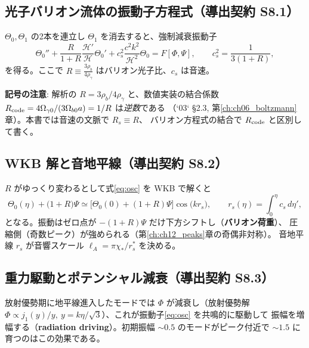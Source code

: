 \subsection{光子バリオン流体の振動子方程式（導出契約 S8.1）}
$\Theta_0,\Theta_1$ の2本を連立し $\Theta_1$ を消去すると、強制減衰振動子
\begin{equation}
  \Theta_0''+\frac{R}{1+R}\frac{\mathcal H'}{\mathcal H}\Theta_0'
  +c_s^2\frac{c^2k^2}{\mathcal H^2}\Theta_0=F[\Phi,\Psi],\qquad
  c_s^2=\frac{1}{3(1+R)},
  \label{eq:osc}
\end{equation}
を得る。ここで $R\equiv\frac{3\rho_b}{4\rho_\gamma}$ はバリオン光子比、$c_s$ は音速。

\begin{numreality}
\textbf{記号の注意}: 解析の $R=3\rho_b/4\rho_\gamma$ と、数値実装の結合係数
$R_{\rm code}=4\Omega_{\gamma0}/(3\Omega_{b0}a)=1/R$ は\emph{逆数}である
（`03` §2.3, 第\ref{ch:ch06_boltzmann}章）。本書では音速の文脈で $R_s\equiv R$、
バリオン方程式の結合で $R_{\rm code}$ と区別して書く。
\end{numreality}

\subsection{WKB 解と音地平線（導出契約 S8.2）}
$R$ がゆっくり変わるとして式\eqref{eq:osc} を WKB で解くと
\begin{equation}
  \Theta_0(\eta)+\big(1+R\big)\Psi\simeq\big[\Theta_0(0)+(1+R)\Psi\big]\cos\!\big(kr_s\big),
  \qquad r_s(\eta)=\int_0^\eta c_s\,d\eta',
\end{equation}
となる。振動はゼロ点が $-(1+R)\Psi$ だけ下方シフトし（\textbf{バリオン荷重}）、
圧縮側（奇数ピーク）が強められる（第\ref{ch:ch12_peaks}章の奇偶非対称）。
音地平線 $r_s$ が音響スケール $\ell_A=\pi\chi_*/r_s^*$ を決める。

\subsection{重力駆動とポテンシャル減衰（導出契約 S8.3）}
放射優勢期に地平線進入したモードでは $\Phi$ が減衰し（放射優勢解
$\Phi\propto j_1(y)/y,\ y=k\eta/\sqrt3$）、これが振動子\eqref{eq:osc} を共鳴的に駆動して
振幅を増幅する（\textbf{radiation driving}）。初期振幅 $\sim0.5$ のモードがピーク付近で
$\sim1.5$ に育つのはこの効果である。


